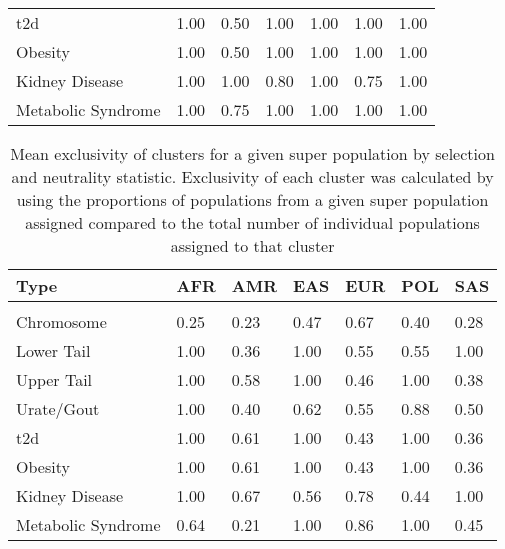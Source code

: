 \documentclass[]{report}
\begin{document}
\begin{table}
\begin{tabular}[t]{lllllll}
\hspace{1em}\Gls{t2d} & 1.00 & 0.50 & 1.00 & 1.00 & 1.00 & 1.00\\
\hspace{1em}Obesity & 1.00 & 0.50 & 1.00 & 1.00 & 1.00 & 1.00\\
\hspace{1em}Kidney Disease & 1.00 & 1.00 & 0.80 & 1.00 & 0.75 & 1.00\\
\hspace{1em}Metabolic Syndrome & 1.00 & 0.75 & 1.00 & 1.00 & 1.00 & 1.00\\
\bottomrule
\end{tabular}
\end{table}

\begin{table}

\caption{\label{tab:exclusivity}\label{tab:exclusivity} Mean exclusivity of clusters for a given super population by selection and neutrality statistic. Exclusivity of each cluster was calculated by using the proportions of populations from a given super population assigned compared to the total number of individual populations assigned to that cluster}
\centering
\begin{tabular}[t]{lllllll}
\toprule
Type & AFR & AMR & EAS & EUR & POL & SAS\\
\midrule
\addlinespace[0.3em]
\multicolumn{7}{l}{\textbf{Fu and Li's F}}\\
\hspace{1em}Chromosome & 0.25 & 0.23 & 0.47 & 0.67 & 0.40 & 0.28\\
\hspace{1em}Lower Tail & 1.00 & 0.36 & 1.00 & 0.55 & 0.55 & 1.00\\
\hspace{1em}Upper Tail & 1.00 & 0.58 & 1.00 & 0.46 & 1.00 & 0.38\\
\hspace{1em}Urate/Gout & 1.00 & 0.40 & 0.62 & 0.55 & 0.88 & 0.50\\
\hspace{1em}\Gls{t2d} & 1.00 & 0.61 & 1.00 & 0.43 & 1.00 & 0.36\\
\hspace{1em}Obesity & 1.00 & 0.61 & 1.00 & 0.43 & 1.00 & 0.36\\
\hspace{1em}Kidney Disease & 1.00 & 0.67 & 0.56 & 0.78 & 0.44 & 1.00\\
\hspace{1em}Metabolic Syndrome & 0.64 & 0.21 & 1.00 & 0.86 & 1.00 & 0.45\\

\end{tabular}
\end{table}
\end{document}
